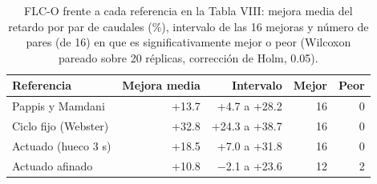 \begin{table}[t]
\centering
\caption{FLC-O frente a cada referencia en la Tabla VIII: mejora media del retardo por par de caudales (\%), intervalo de las 16 mejoras y n\'umero de pares (de 16) en que es significativamente mejor o peor (Wilcoxon pareado sobre 20 r\'eplicas, correcci\'on de Holm, 0.05).}
\label{tab:comparaciones}
\scriptsize
\begin{tabular}{@{}lrrrr@{}}
\toprule
Referencia & Mejora media & Intervalo & Mejor & Peor \\
\midrule
Pappis y Mamdani & +13.7 & +4.7 a +28.2 & 16 & 0 \\
Ciclo fijo (Webster) & +32.8 & +24.3 a +38.7 & 16 & 0 \\
Actuado (hueco 3 s) & +18.5 & +7.0 a +31.8 & 16 & 0 \\
Actuado afinado & +10.8 & $-$2.1 a +23.6 & 12 & 2 \\
\bottomrule
\end{tabular}
\end{table}
